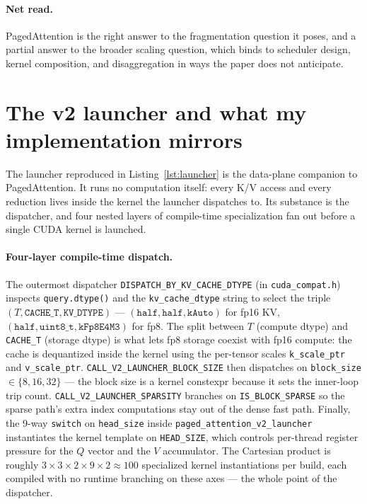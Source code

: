 \documentclass{article}
\begin{document}
\paragraph{Net read.} PagedAttention is the right answer to the fragmentation question it poses, and a partial answer to the broader scaling question, which binds to scheduler design, kernel composition, and disaggregation in ways the paper does not anticipate.

\section{The v2 launcher and what my implementation mirrors}

The launcher reproduced in Listing~\ref{lst:launcher} is the data-plane companion to PagedAttention. It runs no computation itself: every K/V access and every reduction lives inside the kernel the launcher dispatches to. Its substance is the dispatcher, and four nested layers of compile-time specialization fan out before a single CUDA kernel is launched.

\paragraph{Four-layer compile-time dispatch.} The outermost dispatcher \texttt{DISPATCH\_BY\_KV\_CACHE\_DTYPE} (in \texttt{cuda\_compat.h}) inspects \texttt{query.dtype()} and the \texttt{kv\_cache\_dtype} string to select the triple $(T, \texttt{CACHE\_T}, \texttt{KV\_DTYPE})$ --- $(\texttt{half}, \texttt{half}, \texttt{kAuto})$ for fp16 KV, $(\texttt{half}, \texttt{uint8\_t}, \texttt{kFp8E4M3})$ for fp8. The split between $T$ (compute dtype) and \texttt{CACHE\_T} (storage dtype) is what lets fp8 storage coexist with fp16 compute: the cache is dequantized inside the kernel using the per-tensor scales \texttt{k\_scale\_ptr} and \texttt{v\_scale\_ptr}. \texttt{CALL\_V2\_LAUNCHER\_BLOCK\_SIZE} then dispatches on \texttt{block\_size} $\in \{8, 16, 32\}$ --- the block size is a kernel constexpr because it sets the inner-loop trip count. \texttt{CALL\_V2\_LAUNCHER\_SPARSITY} branches on \texttt{IS\_BLOCK\_SPARSE} so the sparse path's extra index computations stay out of the dense fast path. Finally, the 9-way \texttt{switch} on \texttt{head\_size} inside \texttt{paged\_attention\_v2\_launcher} instantiates the kernel template on \texttt{HEAD\_SIZE}, which controls per-thread register pressure for the $Q$ vector and the $V$ accumulator. The Cartesian product is roughly $3 \times 3 \times 2 \times 9 \times 2 \approx 100$ specialized kernel instantiations per build, each compiled with no runtime branching on these axes --- the whole point of the dispatcher.
\end{document}

